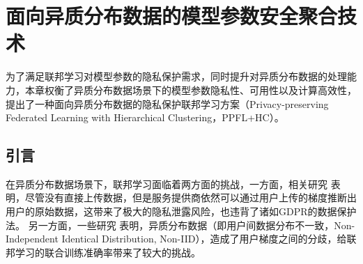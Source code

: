 \chapter{面向异质分布数据的模型参数安全聚合技术}\label{ppfl+hc}
为了满足联邦学习对模型参数的隐私保护需求，同时提升对异质分布数据的处理能力，本章权衡了异质分布数据场景下的模型参数隐私性、可用性以及计算高效性，提出了一种面向异质分布数据的隐私保护联邦学习方案（Privacy-preserving Federated Learning with Hierarchical Clustering，PPFL+HC）。

\section{引言}

在异质分布数据场景下，联邦学习面临着两方面的挑战，一方面，相关研究 \cite{geiping2020inverting,zhu2019deep,gao2021privacy} 表明，尽管没有直接上传数据，但是服务提供商依然可以通过用户上传的梯度推断出用户的原始数据，这带来了极大的隐私泄露风险，也违背了诸如GDPR\cite{voigt2017eu}的数据保护法。
另一方面，一些研究 \cite{zhao2018federated, tuor2021overcoming, yoshida2019hybrid}表明，异质分布数据（即用户间数据分布不一致，Non-Independent Identical Distribution, Non-IID），造成了用户梯度之间的分歧，给联邦学习的联合训练准确率带来了较大的挑战。


